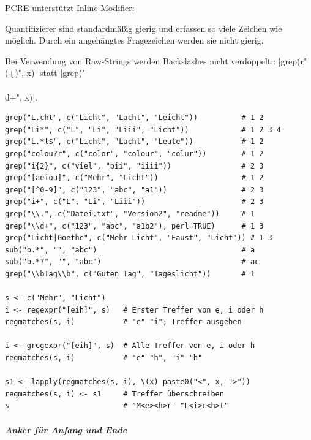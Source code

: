 \documentclass[10pt,twocolumn]{scrartcl}
\renewcommand{\lstinline}{\mycoloredinline}
\begin{document}
PCRE unterstützt Inline-Modifier:

Quantifizierer sind standardmäßig gierig und erfassen so viele Zeichen wie möglich. Durch ein angehängtes Fragezeichen werden sie nicht gierig. 

Bei Verwendung von Raw-Strings werden Backslashes nicht verdoppelt:: \lstinline|grep(r"(\d+)", x)| statt \lstinline|grep("\\\\d+", x)|.

\begin{lstlisting}
grep("L.cht", c("Licht", "Lacht", "Leicht"))          # 1 2
grep("Li*", c("L", "Li", "Liii", "Licht"))            # 1 2 3 4
grep("L.*t$", c("Licht", "Lacht", "Leute"))           # 1 2
grep("colou?r", c("color", "colour", "colur"))        # 1 2
grep("i{2}", c("viel", "pii", "iiii"))                # 2 3
grep("[aeiou]", c("Mehr", "Licht"))                   # 1 2
grep("[^0-9]", c("123", "abc", "a1"))                 # 2 3
grep("i+", c("L", "Li", "Liii"))                      # 2 3
grep("\\.", c("Datei.txt", "Version2", "readme"))     # 1
grep("\\d+", c("123", "abc", "a1b2"), perl=TRUE)      # 1 3
grep("Licht|Goethe", c("Mehr Licht", "Faust", "Licht")) # 1 3
sub("b.*", "", "abc")                                 # a
sub("b.*?", "", "abc")                                # ac
grep("\\bTag\\b", c("Guten Tag", "Tageslicht"))       # 1

s <- c("Mehr", "Licht")
i <- regexpr("[eih]", s)   # Erster Treffer von e, i oder h
regmatches(s, i)           # "e" "i"; Treffer ausgeben

i <- gregexpr("[eih]", s)  # Alle Treffer von e, i oder h
regmatches(s, i)           # "e" "h", "i" "h"

s1 <- lapply(regmatches(s, i), \(x) paste0("<", x, ">"))
regmatches(s, i) <- s1     # Treffer überschreiben
s                          # "M<e><h>r" "L<i>c<h>t"
\end{lstlisting}

\subparagraph{Anker für Anfang und Ende}
\end{document}
